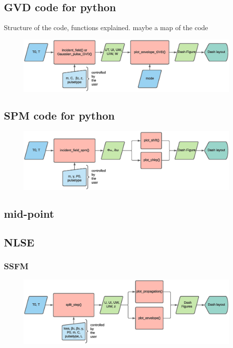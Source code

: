     
    
    \subsection{GVD code for python}
    Structure of the code, functions explained. maybe a map of the code
    \begin{figure}[label={fig:gvddash}, caption={Simplified Block-Diagram of gvd.py}]
        	\includegraphics[trim = 2.5cm 12.5cm 5cm 2.5cm, clip, clip,width=1\textwidth]{figures/chap3/GVD.eps} 
        \end{figure}
    \subsection{SPM code for python}
        \begin{figure}[label={fig:spmdash}, caption={Simplified Block-Diagram of spm.py}]
        	\includegraphics[trim = 0.5cm 12.5cm 6.5cm 1.2cm, clip, clip,width=1\textwidth]{figures/chap3/SPM.eps} 
        \end{figure}
        \subsection{mid-point}
    \subsection{NLSE}
        \subsubsection{SSFM}
        \begin{figure}[label={fig:ssfmdash}, caption={Simplified Block-Diagram of nlse.py}]
        	\includegraphics[trim = 0.5cm 12.5cm 6.5cm 0.6cm, clip, clip,width=1\textwidth]{figures/chap3/SSFM.eps} 
        \end{figure}